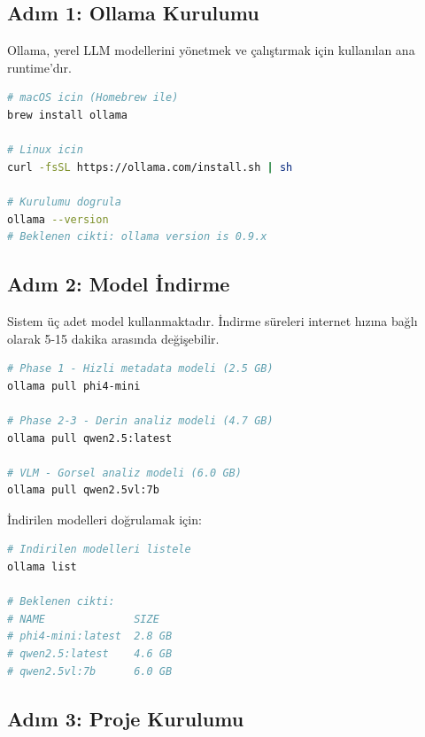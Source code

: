 \documentclass[11pt,a4paper]{article}
\begin{document}
\subsection{Adım 1: Ollama Kurulumu}

Ollama, yerel LLM modellerini yönetmek ve çalıştırmak için kullanılan ana runtime'dır.

\begin{lstlisting}[language=bash, basicstyle=\ttfamily\small, frame=single, breaklines=true, caption={Ollama Kurulumu}]
# macOS icin (Homebrew ile)
brew install ollama

# Linux icin
curl -fsSL https://ollama.com/install.sh | sh

# Kurulumu dogrula
ollama --version
# Beklenen cikti: ollama version is 0.9.x
\end{lstlisting}

\subsection{Adım 2: Model İndirme}

Sistem üç adet model kullanmaktadır. İndirme süreleri internet hızına bağlı olarak 5-15 dakika arasında değişebilir.

\begin{lstlisting}[language=bash, basicstyle=\ttfamily\small, frame=single, breaklines=true, caption={Model İndirme}]
# Phase 1 - Hizli metadata modeli (2.5 GB)
ollama pull phi4-mini

# Phase 2-3 - Derin analiz modeli (4.7 GB)
ollama pull qwen2.5:latest

# VLM - Gorsel analiz modeli (6.0 GB)
ollama pull qwen2.5vl:7b
\end{lstlisting}

İndirilen modelleri doğrulamak için:

\begin{lstlisting}[language=bash, basicstyle=\ttfamily\small, frame=single, breaklines=true, caption={Model Doğrulama}]
# Indirilen modelleri listele
ollama list

# Beklenen cikti:
# NAME              SIZE
# phi4-mini:latest  2.8 GB
# qwen2.5:latest    4.6 GB
# qwen2.5vl:7b      6.0 GB
\end{lstlisting}

\subsection{Adım 3: Proje Kurulumu}
\end{document}
